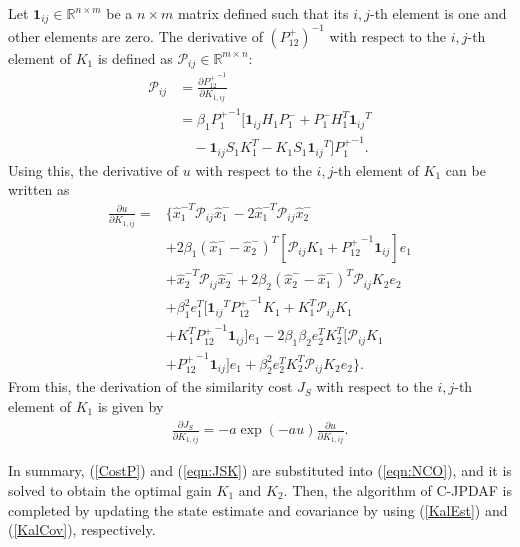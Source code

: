 \documentclass[letterpaper, 10pt, conference]{ieeeconf}
\newcommand{\refeqn}[1]{(\ref{eqn:#1})}
\renewcommand{\Re}{\ensuremath{\mathbb{R}}}
\begin{document}

\newcommand{\Iij}{\ensuremath{\mathbf{1}_{ij}}}

Let $\Iij\in \Re^{n\times m}$ be a $n\times m$ matrix defined such that its $i,j$-th element is one and other elements are zero. The derivative of $(P_{12}^+)^{-1}$ with respect to the $i,j$-th element of $K_1$ is defined as $\mathcal{P}_{ij}\in\Re^{m\times n}$:
\begin{align}
\mathcal{P}_{ij}&=\frac{\partial {P^+_{12}}^{-1}}{\partial K_{1,ij}}\nonumber\\
&=\beta_1{P_1^+}^{-1}[\Iij H_1P_1^-+P_1^-H_1^T\Iij^T\nonumber\\
&\quad -\Iij S_1K_1^T -K_1S_1\Iij^T]{P_1^+}^{-1}.
\end{align}
Using this, the derivative of $u$ with respect to the $i,j$-th element of $K_1$ can be written as
\begin{align}
\frac{\partial u}{\partial K_{1,ij}}%
=& \{\hat x_1^{-T}\mathcal{P}_{ij}\hat x_1^-
-2\hat x_1^{-T}\mathcal{P}_{ij}\hat x_2^-\nonumber\\
&+2\beta_1(\hat x_1^{-}-\hat x_2^{-})^T[\mathcal{P}_{ij}K_1+{P^+_{12}}^{-1}\Iij]e_1\nonumber\\
&+\hat x_2^{-T}\mathcal{P}_{ij}\hat x_2^-+2\beta_2(\hat x_2^{-}-\hat x_1^{-})^T\mathcal{P}_{ij}K_2e_2\nonumber\\
&+\beta_1^2e_1^T[\Iij^T{P^+_{12}}^{-1}K_1+K_1^T\mathcal{P}_{ij}K_1\nonumber\\
&+K_1^T{P^+_{12}}^{-1}\Iij]e_1-2\beta_1\beta_2e_2^TK_2^T[\mathcal{P}_{ij}K_1\nonumber\\
&+{P^+_{12}}^{-1}\Iij]e_1+\beta_2^2e_2^TK_2^T\mathcal{P}_{ij}K_2e_2\}.
\end{align}
From this, the derivation of the similarity cost $J_S$ with respect to the $i,j$-th element of $K_1$ is given by
\begin{align}
\frac{\partial J_{S}}{\partial K_{1,ij}}=-a\exp(-au)\frac{\partial u}{\partial K_{1,ij}}.\label{eqn:JSK}
\end{align}

In summary, (\ref{CostP}) and \refeqn{JSK} are substituted into \refeqn{NCO}, and it is solved to obtain the optimal gain $K_1$ and $K_2$. Then, the algorithm of C-JPDAF is completed by updating the state estimate and covariance by using (\ref{KalEst}) and (\ref{KalCov}), respectively. 
\end{document}

